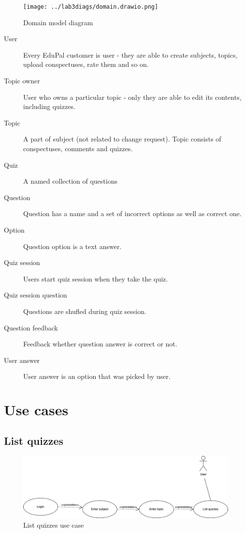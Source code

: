 \documentclass[
    english, %
]{VUMIFPSkursinis}
\begin{document}
\begin{figure}[ht]
    \centering
    \texttt{[image: ../lab3diags/domain.drawio.png]}
    \caption{Domain model diagram}
    \label{domain-model}
\end{figure}

\begin{description}
    \item[User] Every EduPal customer is user - they are able to create subjects, topics, upload conspectuses, rate them and so on.
    \item[Topic owner] User who owns a particular topic - only they are able to edit its contents, including quizzes.
    \item[Topic] A part of subject (not related to change request). Topic consists of conspectuses, comments and quizzes.
    \item[Quiz] A named collection of questions
    \item[Question] Question has a name and a set of incorrect options as well as correct one.
    \item[Option] Question option is a text answer.
    \item[Quiz session] Users start quiz session when they take the quiz.
    \item[Quiz session question] Questions are shufled during quiz session.
    \item[Question feedback] Feedback whether question answer is correct or not.
    \item[User answer] User answer is an option that was picked by user.
\end{description}

\section{Use cases}

\subsection{List quizzes}

\begin{figure}[ht]
    \centering
    \includegraphics[width=\textwidth]{../lab3diags/list.drawio Large.jpeg}
    \caption{List quizzes use case}
    \label{list-quizzes}
\end{figure}
\end{document}
